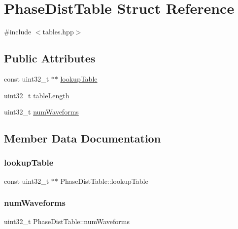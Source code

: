 \hypertarget{struct_phase_dist_table}{}\section{Phase\+Dist\+Table Struct Reference}
\label{struct_phase_dist_table}


{\ttfamily \#include $<$tables.\+hpp$>$}

\subsection*{Public Attributes}
\begin{DoxyCompactItemize}
\item 
const uint32\+\_\+t $\ast$$\ast$ \mbox{\hyperlink{struct_phase_dist_table_a0d63dac706e024a8872338dd95eaf08e}{lookup\+Table}}
\item 
uint32\+\_\+t \mbox{\hyperlink{struct_phase_dist_table_a1b871e67ce74c58645cd378ab683bc5d}{table\+Length}}
\item 
uint32\+\_\+t \mbox{\hyperlink{struct_phase_dist_table_a023efda4043cb3f09c93f6df8bbefcf1}{num\+Waveforms}}
\end{DoxyCompactItemize}


\subsection{Member Data Documentation}
\mbox{\label{struct_phase_dist_table_a0d63dac706e024a8872338dd95eaf08e}} 
\subsubsection{\texorpdfstring{lookup\+Table}{lookupTable}}
{\footnotesize\ttfamily const uint32\+\_\+t $\ast$$\ast$ Phase\+Dist\+Table\+::lookup\+Table}

\mbox{\label{struct_phase_dist_table_a023efda4043cb3f09c93f6df8bbefcf1}} 
\subsubsection{\texorpdfstring{num\+Waveforms}{numWaveforms}}
{\footnotesize\ttfamily uint32\+\_\+t Phase\+Dist\+Table\+::num\+Waveforms}

